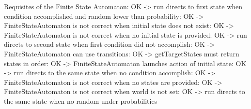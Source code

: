 \documentclass[a4paper]{article}
\begin{document}
Requisites of the Finite State Automaton: OK -{\textgreater} run directs to first state when condition
accomplished and random lower than probability: OK -{\textgreater} FiniteStateAutomaton is not correct when initial
state does not exist: OK -{\textgreater} FiniteStateAutomaton is not correct when no
initial state is provided: OK -{\textgreater} run directs to second state when first condition
did not accomplish: OK -{\textgreater} FiniteStateAutomaton can use transitions: OK -{\textgreater} getTargetStates must return states in
order: OK -{\textgreater} FiniteStateAutomaton launches action of initial
state: OK -{\textgreater} run directs to the same state when no condition
accomplish: OK -{\textgreater} FiniteStateAutomaton is not correct when no states
are provided: OK -{\textgreater} FiniteStateAutomaton is not correct when world is
not set: OK -{\textgreater} run directs to the same state when no random
under probabilities
\end{document}
